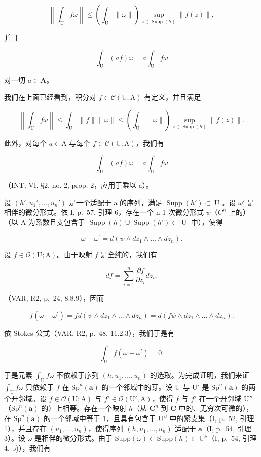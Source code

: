 \[
\left\| \int_ {\mathrm{U}} f \omega \right\| \leqslant \left(\int_ {\mathrm{U}} \| \omega \|\right) \sup _ {z \in \operatorname{Supp} (h)} \| f (z) \|,\tag{4}
\]

并且

\[
\int_ {\mathrm{U}} (a f) \omega = a \int_ {\mathrm{U}} f \omega
\]

对一切 \(a \in \mathbf{A}\)。

我们在上面已经看到，积分对 \(f \in \mathcal{C}(\mathrm{U};\mathrm{A})\) 有定义，并且满足

\[
\left\| \int_ {\mathrm{U}} f \omega \right\| \leqslant \int_ {\mathrm{U}} \| f \| \| \omega \| \leqslant \left(\int_ {\mathrm{U}} \| \omega \|\right) \sup _ {z \in \operatorname{Supp} (h)} \| f (z) \|.
\]

此外，对每个 \(a \in \mathrm{A}\) 与每个 \(f \in \mathcal{C}(\mathrm{U};\mathrm{A})\)，我们有

\[
\int_ {\mathrm{U}} (a f) \omega = a \int_ {\mathrm{U}} f \omega
\]

（INT, VI, §2, no. 2, prop. 2，应用于乘以 a）。

设 \((h', u_{1}', \ldots, u_{n}')\) 是一个适配于 a 的序列，满足 \(\operatorname{Supp}(h') \subset \operatorname{U}\)。设 \(\omega'\) 是相伴的微分形式。依 I, p.~57, 引理 6，存在一个 n-1 次微分形式 \(\psi\)（\(C^{n}\) 上的）（以 A 为系数且支包含于 \(\operatorname{Supp}(h) \cup \operatorname{Supp}(h') \subset \operatorname{U}\) 中），使得

\[
\omega - \omega^ {\prime} = d (\psi \wedge d z _ {1} \wedge \dots \wedge d z _ {n}).
\]

设 \(f \in \mathcal{O}(\mathrm{U};\mathrm{A})\)。由于映射 \(f\) 是全纯的，我们有

\[
d f = \sum_ {i = 1} ^ {n} \frac {\partial f}{\partial z _ {i}} d z _ {i},
\]

（VAR, R2, p.~24, 8.8.9），因而

\[
f \left(\omega - \omega^ {\prime}\right) = f d \left(\psi \wedge d z _ {1} \wedge \dots \wedge d z _ {n}\right) = d \left(f \psi \wedge d z _ {1} \wedge \dots \wedge d z _ {n}\right).
\]

依 Stokes 公式（VAR, R2, p.~48, 11.2.3），我们于是有

\[
\int_ {\mathrm{U}} f (\omega - \omega^ {\prime}) = 0.
\]

于是元素 \(\int_{\mathrm{U}} f\omega\) 不依赖于序列 \((h, u_1, \ldots, u_n)\) 的选取。为完成证明，我们来证 \(\int_{\mathrm{U}} f\omega\) 只依赖于 \(f\) 在 \(\mathrm{Sp}^n(\boldsymbol{a})\) 的一个邻域中的芽。设 U 与 \(\mathrm{U}'\) 是 \(\mathrm{Sp}^n(\boldsymbol{a})\) 的两个开邻域。设 \(f \in \mathcal{O}(\mathrm{U}; \mathrm{A})\) 与 \(f' \in \mathcal{O}(\mathrm{U}', \mathrm{A})\)，使得 \(f\) 与 \(f'\) 在一个开邻域 \(\mathrm{U}''\)（\(\mathrm{Sp}^n(\boldsymbol{a})\) 的）上相等。存在一个映射 \(h\)（从 \(\mathbf{C}^n\) 到 \(\mathbf{C}\) 中的、无穷次可微的），在 \(\mathrm{Sp}^n(\boldsymbol{a})\) 的一个邻域中等于 1，且具有包含于 \(\mathrm{U}''\) 中的紧支集（I, p.~52, 引理 1），并且存在 \((u_1, \ldots, u_n)\)，使得序列 \((h, u_1, \ldots, u_n)\) 适配于 \(\boldsymbol{a}\)（I, p.~54, 引理 3）。设 \(\omega\) 是相伴的微分形式。由于 \(\mathrm{Supp}(\omega) \subset \mathrm{Supp}(h) \subset \mathrm{U}''\)（I, p.~54, 引理 4, b)），我们有

